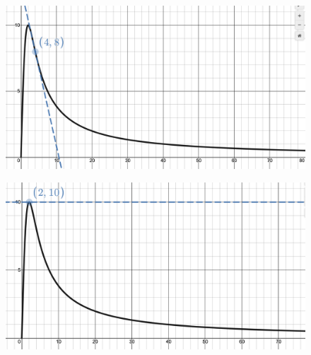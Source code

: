     \begin{figure}[h!]
 \centering
    \includegraphics[scale=0.275]{images/productQuotient/11_5b.png}
    \caption{}
    \end{figure}
      \begin{figure}[h!]
 \centering
    \includegraphics[scale=0.275]{images/productQuotient/11_5c.png}
    \caption{}
    \end{figure}
\newpage
